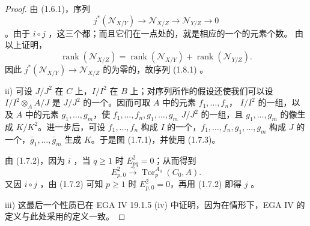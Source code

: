 \begin{proof}
由 (1.6.1)，序列
\[
j^*(\mathcal N_{X/Y})\longrightarrow\mathcal N_{X/Z}\longrightarrow\mathcal N_{Y/Z}\longrightarrow0
\]
。由于 $i\circ j$ ，这三个都；而且它们在一点处的，就是相应的一个的元素个数。
由以上证明，
\[
\operatorname{rank}(\mathcal N_{X/Z})=\operatorname{rank}(\mathcal N_{X/Y})+\operatorname{rank}(\mathcal N_{Y/Z}).
\]
因此 $j^*(\mathcal N_{X/Y})\to\mathcal N_{X/Z}$ 的为零的，故序列 (1.8.1) 。

 ii) 可设 $J/J^2$ 在 $C$ 上，$I/I^2$ 在 $B$ 上；对序列所作的假设还使我们可以设 $I/I^2\otimes_A A/J$ 是 $J/J^2$ 的一个。因而可取 $A$ 中的元素 $f_1,\ldots,f_n$， $I/I^2$ 的一组，以及 $A$ 中的元素 $g_1,\ldots,g_m$，使 $f_1,\ldots,f_n,g_1,\ldots,g_m$  $J/J^2$ 的一组，且 $g_1,\ldots,g_m$ 的像生成 $K/K^2$。进一步后，可设 $f_1,\ldots,f_n$ 构成 $I$ 的一个，$f_1,\ldots,f_n,g_1,\ldots,g_m$ 构成 $J$ 的一个，$\bar g_1,\ldots,\bar g_m$ 生成 $K$。于是图 (1.7.1)，并使用 (1.7.3)。

由 (1.7.2)，因为 $i$ ，当 $q\geq1$ 时 $E^2_{pq}=0$；从而得到
\[
E^2_{p,0}\xrightarrow{\sim}\operatorname{Tor}_p^{A_0}(C_0,A).
\]
又因 $i\circ j$ ，由 (1.7.2) 可知 $p\geq1$ 时 $E^2_{p,0}=0$，再用 (1.7.2) 即得 $j$ 。

 iii) 这最后一个性质已在 EGA IV 19.1.5 (iv) 中证明，因为在情形下，EGA IV 的定义与此处采用的定义一致。
\end{proof}

